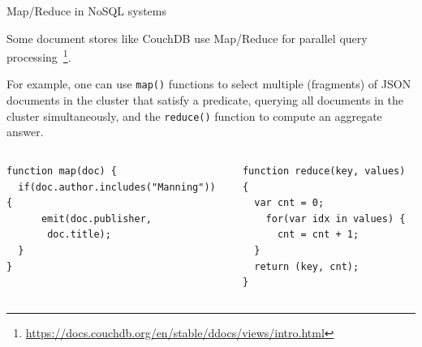 %
%


\begin{frame}[fragile]{Map/Reduce in NoSQL systems}

Some document stores like CouchDB use Map/Reduce for parallel query processing~\footnote{\url{https://docs.couchdb.org/en/stable/ddocs/views/intro.html}}. 

For example, one can use \lstinline!map()! functions to select multiple (fragments) of JSON documents in the cluster that satisfy a predicate, querying all documents in the cluster simultaneously, and the \lstinline!reduce()! function to compute an aggregate answer.

\begin{columns}[onlytextwidth]
\begin{column}{0.5\textwidth}
\begin{lstlisting}[basicstyle=\ttfamily\scriptsize]
function map(doc) {
  if(doc.author.includes("Manning")) {
      emit(doc.publisher,
       doc.title);
  }
}
\end{lstlisting}
\end{column}
\quad\begin{column}{0.45\textwidth}
\begin{lstlisting}[basicstyle=\ttfamily\scriptsize]
function reduce(key, values) {
  var cnt = 0;
    for(var idx in values) {
      cnt = cnt + 1;
  }
  return (key, cnt);
}\end{lstlisting}
\end{column}
\end{columns}
\end{frame}

